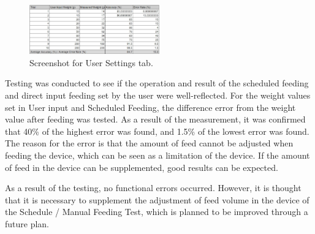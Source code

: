 \documentclass[conference]{IEEEtran}
\begin{document}
\begin{figure}[htbp]
\centerline{\includegraphics[width=0.5\textwidth]{./images/Feeding_sheet.jpg}}
\caption{Screenshot for User Settings tab.}
\label{fig}
\end{figure}

Testing was conducted to see if the operation and result of the scheduled feeding and direct input feeding set by the user were well-reflected.
For the weight values set in User input and Scheduled Feeding, the difference error from the weight value after feeding was tested.
As a result of the measurement, it was confirmed that 40\% of the highest error was found, and 1.5\% of the lowest error was found.
The reason for the error is that the amount of feed cannot be adjusted when feeding the device, which can be seen as a limitation of the device. If the amount of feed in the device can be supplemented, good results can be expected.

As a result of the testing, no functional errors occurred.
However, it is thought that it is necessary to supplement the adjustment of feed volume in the device of the Schedule / Manual Feeding Test, which is planned to be improved through a future plan.
\end{document}
